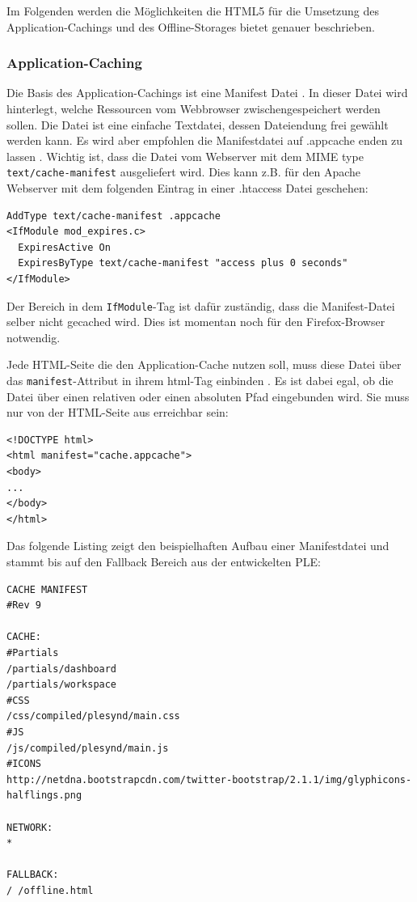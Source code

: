 Im Folgenden werden die Möglichkeiten die HTML5 für die Umsetzung des Application-Cachings und des Offline-Storages bietet genauer beschrieben.

\subsubsection{Application-Caching}\label{section:appcache}
Die Basis des Application-Cachings ist eine Manifest Datei \cite{html5_rocks_appcache_leitfaden}. In dieser Datei wird hinterlegt, welche Ressourcen vom Webbrowser zwischengespeichert werden sollen. Die Datei ist eine einfache Textdatei, dessen Dateiendung frei gewählt werden kann. Es wird aber empfohlen die Manifestdatei auf .appcache enden zu lassen \cite{w3c_offline_appcache}. Wichtig ist, dass die Datei vom Webserver mit dem MIME type \texttt{text/cache-manifest} ausgeliefert wird. Dies kann z.B. für den  Apache Webserver mit dem folgenden Eintrag in einer .htaccess Datei geschehen: 
\begin{lstlisting}
AddType text/cache-manifest .appcache
<IfModule mod_expires.c>
  ExpiresActive On
  ExpiresByType text/cache-manifest "access plus 0 seconds"
</IfModule>
\end{lstlisting}
Der Bereich in dem \texttt{IfModule}-Tag ist dafür zuständig, dass die Manifest-Datei selber nicht gecached wird. Dies ist momentan noch für den Firefox-Browser notwendig.

Jede HTML-Seite die den Application-Cache nutzen soll, muss diese Datei über das \texttt{manifest}-Attribut in ihrem html-Tag einbinden \cite{html5_up_and_running_chapter_8}. Es ist dabei egal, ob die Datei über einen relativen oder einen absoluten Pfad eingebunden wird. Sie muss nur von der HTML-Seite aus erreichbar sein:
\begin{lstlisting}
<!DOCTYPE html>
<html manifest="cache.appcache">
<body>
...
</body>
</html>
\end{lstlisting}

Das folgende Listing zeigt den beispielhaften Aufbau einer Manifestdatei und stammt bis auf den Fallback Bereich aus der entwickelten PLE:
\begin{lstlisting}
CACHE MANIFEST
#Rev 9

CACHE:
#Partials
/partials/dashboard
/partials/workspace
#CSS
/css/compiled/plesynd/main.css
#JS
/js/compiled/plesynd/main.js
#ICONS
http://netdna.bootstrapcdn.com/twitter-bootstrap/2.1.1/img/glyphicons-halflings.png

NETWORK:
*

FALLBACK:
/ /offline.html
\end{lstlisting}

